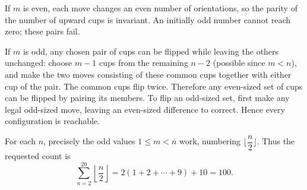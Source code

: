 If $m$ is even, each move changes an even number of orientations, so the parity of the number of upward cups is invariant. An initially odd number cannot reach zero; these pairs fail.

If $m$ is odd, any chosen pair of cups can be flipped while leaving the others unchanged: choose $m-1$ cups from the remaining $n-2$ (possible since $m<n$), and make the two moves consisting of these common cups together with either cup of the pair. The common cups flip twice. Therefore any even-sized set of cups can be flipped by pairing its members. To flip an odd-sized set, first make any legal odd-sized move, leaving an even-sized difference to correct. Hence every configuration is reachable.

For each $n$, precisely the odd values $1\le m<n$ work, numbering $\lfloor \dfrac{n}{2}\rfloor$. Thus the requested count is
\[
\boxed{\sum_{n=2}^{20}\left\lfloor\dfrac{n}{2}\right\rfloor
=2(1+2+\cdots+9)+10=100}.
\]
